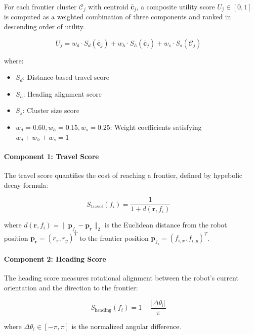 \documentclass[11pt]{article}
\begin{document}
For each frontier cluster $\mathcal{C}_j$ with centroid $\bar{\mathbf{c}}_j$, a composite utility score $U_j \in [0, 1]$ is computed as a weighted combination of three components and ranked in descending order of utility.

\begin{equation}
	U_j = w_d \cdot S_d(\bar{\mathbf{c}}_j) + w_h \cdot S_h(\bar{\mathbf{c}}_j) + w_s \cdot S_s(\mathcal{C}_j)
\end{equation}

where:
\begin{itemize}[noitemsep]
	\item $S_d$: Distance-based travel score
	\item $S_h$: Heading alignment score
	\item $S_s$: Cluster size score
	\item $w_d = 0.60, w_h = 0.15, w_s = 0.25$: Weight coefficients satisfying $w_d + w_h + w_s = 1$
\end{itemize}

\paragraph{Component 1: Travel Score}

The travel score quantifies the cost of reaching a frontier, defined by hypebolic decay formula:

\begin{equation}
	S_{\text{travel}}(f_i) = \frac{1}{1 + d(\mathbf{r}, f_i)}
\end{equation}

where $d(\mathbf{r}, f_i) = \|\mathbf{p}_{f_i} - \mathbf{p}_\mathbf{r}\|_2$ is the Euclidean distance from the robot position $\mathbf{p}_\mathbf{r} = (r_x, r_y)^T$ to the frontier position $\mathbf{p}_{f_i} = (f_{i,x}, f_{i,y})^T$.

\paragraph{Component 2: Heading Score}

The heading score measures rotational alignment between the robot's current orientation and the direction to the frontier:

\begin{equation}
	S_{\text{heading}}(f_i) = 1 - \frac{|\Delta\theta_i|}{\pi}
\end{equation}

where $\Delta\theta_i \in [-\pi, \pi]$ is the normalized angular difference.
\end{document}
